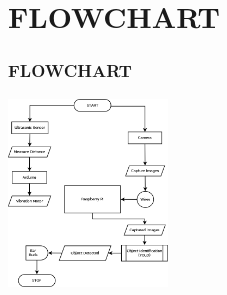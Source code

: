 \documentclass[
	11pt, %
	t, %
	aspectratio=169, %
]{beamer}
\begin{document}

\section{FLOWCHART}
\begin{frame}
	\frametitle{FLOWCHART}
	\centering
	\includegraphics[width=160px]{Diagram1.png}
\end{frame}
\end{document}
